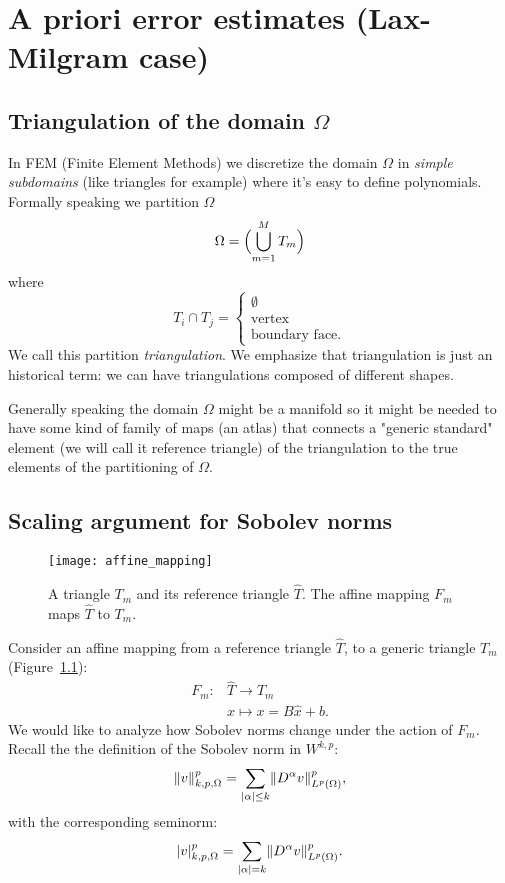 
\chapter[A priori error estimates (Lax-Milgram case)]{A priori error estimates (Lax-Milgram case)}

\section{Triangulation of the domain $\Omega$}
In FEM (Finite Element Methods) we discretize the domain $\Omega$ in \emph{simple subdomains} (like triangles for example) where it's easy to define polynomials. Formally speaking we partition $\Omega$
\begin{equation*}
\Omega = \Bigl(\bigcup_{m=1}^M T_m \Bigr)
\end{equation*}
where 
\begin{equation}
T_i \cap T_j = \begin{cases}\emptyset \\ \text{vertex} \\ \text{boundary face}.\end{cases}
\end{equation}
We call this partition \emph{triangulation}. We emphasize that triangulation is just an historical term: we can have triangulations composed of different shapes.

Generally speaking the domain $\Omega$ might be a manifold so it might be needed to have some kind of family of maps (an atlas) that connects a "generic standard" element (we will call it reference triangle) of the triangulation to the true elements of the partitioning of $\Omega$. 

\section{Scaling argument for Sobolev norms}

\begin{figure}[!ht]
\centering
\texttt{[image: affine\_mapping]}
\caption{A triangle $T_m$ and its reference triangle $\hat{T}$. The affine mapping $F_m$ maps $\hat{T}$ to $T_m$.}
\label{fig:affine_mapping}
\end{figure}

Consider an affine mapping from a reference triangle $\hat T$, to a generic triangle $T_m$ (Figure~\ref{fig:affine_mapping}):
\begin{align}
F_m: &\hat{T} \to T_m \\
&\hat{x} \mapsto x = B \hat{x} + b.
\end{align}
We would like to analyze how Sobolev norms change under the action of $F_m$. Recall the the definition of the Sobolev norm in $W^{k,p}$:
\[
\lVert v\rVert^p_{k,p,\Omega} = \sum_{\lvert\alpha\rvert \le k} \lVert D^\alpha v\rVert^p_{L^p(\Omega)},
\]
with the corresponding seminorm:
\[
\lvert v\rvert^p_{k,p,\Omega} = \sum_{\lvert\alpha\rvert = k} \lVert D^\alpha v\rVert^p_{L^p(\Omega)}.
\]

